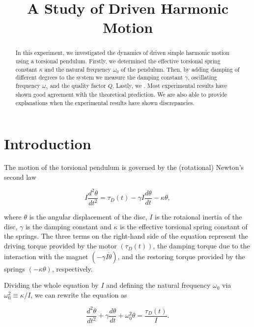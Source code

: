 \documentclass[11pt]{article}
\title{A Study of Driven Harmonic Motion}
\begin{document}
\maketitle

\begin{abstract}
    In this experiment, we investigated the dynamics of driven simple harmonic motion using a torsional pendulum. Firstly, we determined the effective torsional spring constant \(\kappa \)  and the natural frequency \(\omega _{0} \) of the pendulum. Then, by adding damping of different degrees to the system we measure the damping constant \(\gamma \), oscillating frequency \(\omega _{\gamma } \)  and the quality factor \(Q\). Lastly, we . Most experimental results have shown good agreement with the theoretical prediction. We are also able to provide explanations when the experimental results have shown discrepancies.
\end{abstract}

\section{Introduction}

The motion of the torsional pendulum is governed by the (rotational) Newton's second law

\begin{equation}
    I \frac{d^2\theta }{dt^2}  = \tau _{D}(t) -  \gamma I \frac{d \theta }{dt} - \kappa \theta,
\end{equation}

where \(\theta \) is the angular displacement of the disc, \(I\) is the rotaional inertia of the disc, \(\gamma \) is the damping constant and \(\kappa \) is the effective torsional spring constant of the springs. The three terms on the right-hand side of the equation represent the driving torque provided by the motor \(\left( \tau _{D}(t)  \right)\), the damping torque due to the interaction with the magnet \(( - \gamma I \dot{\theta }  )\), and the restoring torque provided by the springs \((- \kappa \theta )\), respectively. 

Dividing the whole equation by \(I\) and defining the natural frequency \(\omega _{0} \) via \(\omega _{0}^2 \equiv \kappa /I \), we can rewrite the equation as 

\begin{equation}
    \frac{d^2\theta }{dt^2} + \gamma \frac{d \theta }{dt} + \omega _{0} ^2 \theta = \frac{\tau _{D}(t) }{I}. \label{main} 
\end{equation}
\end{document}
